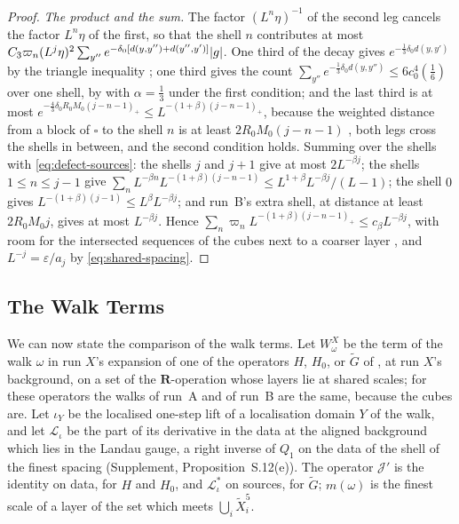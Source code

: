 \documentclass[11pt]{preprint}
\DeclarePairedDelimiter{\abs}{\lvert}{\rvert}
\numberwithin{equation}{section}
\theoremstyle{definition}
\theoremstyle{remark}
\theoremstyle{plain}
\begin{document}
\begin{proof}
\emph{The product and the sum.} The factor $(L^n\eta)^{-1}$ of the second leg cancels the factor $L^n\eta$ of the first, so that the shell $n$ contributes at most $C_3\varpi_n(L^j\eta)^2\sum_{y''}e^{-\delta_0[d(y, y'') + d(y'', y')]}\abs{g}$. One third of the decay gives $e^{-\frac13\delta_0d(y, y')}$ by the triangle inequality \cite[(2.54)]{BalabanPRT2}; one third gives the count $\sum_{y''}e^{-\frac13\delta_0d(y, y'')} \leq 6c_0^4(\frac16)$ over one shell, by \cite[(2.58)]{BalabanPRT2} with $\alpha = \frac13$ under the first condition; and the last third is at most $e^{-\frac43\delta_0R_0M_0(j-n-1)_+} \leq L^{-(1+\beta)(j-n-1)_+}$, because the weighted distance from a block of $\square$ to the shell $n$ is at least $2R_0M_0(j - n - 1)$ \cite[(2.60)]{BalabanPRT2}, both legs cross the shells in between, and the second condition holds. Summing over the shells with \eqref{eq:defect-sources}: the shells $j$ and $j + 1$ give at most $2L^{-\beta j}$; the shells $1 \leq n \leq j - 1$ give $\sum_nL^{-\beta n}L^{-(1+\beta)(j-n-1)} \leq L^{1+\beta}L^{-\beta j}/(L - 1)$; the shell $0$ gives $L^{-(1+\beta)(j-1)} \leq L^\beta L^{-\beta j}$; and run~B's extra shell, at distance at least $2R_0M_0j$, gives at most $L^{-\beta j}$. Hence $\sum_n\varpi_nL^{-(1+\beta)(j-n-1)_+} \leq c_\beta L^{-\beta j}$, with room for the intersected sequences of the cubes next to a coarser layer \cite[p.~408]{BalabanPBG}, and $L^{-j} = \varepsilon/a_j$ by \eqref{eq:shared-spacing}.
\end{proof}

\subsection{The Walk Terms}\label{sec:walk-terms}

We can now state the comparison of the walk terms. Let $W^X_\omega$ be the term of the walk $\omega$ in run $X$'s expansion of one of the operators $H$, $H_0$, or $\tilde G$ of \cite[(1.2)--(1.4), p.~2]{BalabanRG2}, at run $X$'s background, on a set of the $\mathbf R$-operation whose layers lie at shared scales; for these operators the walks of run~A and of run~B are the same, because the cubes are. Let $\iota_Y$ be the localised one-step lift of a localisation domain $Y$ of the walk, and let $\mathcal L_\iota$ be the part of its derivative in the data at the aligned background which lies in the Landau gauge, a right inverse of $Q_1$ on the data of the shell of the finest spacing (Supplement, Proposition~S.12(e)). The operator $\mathcal J'$ is the identity on data, for $H$ and $H_0$, and $\mathcal L_\iota^*$ on sources, for $\tilde G$; $m(\omega)$ is the finest scale of a layer of the set which meets $\bigcup_i\tilde X_i^5$.
\end{document}
